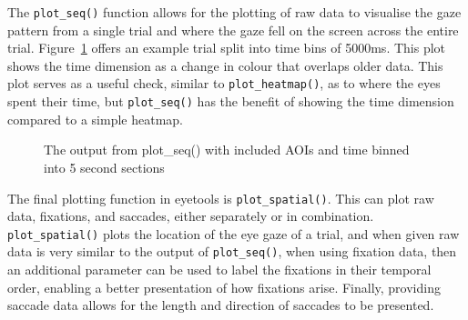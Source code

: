\documentclass[
  man,
  floatsintext,
  longtable,
  nolmodern,
  notxfonts,
  notimes,
  colorlinks=true,linkcolor=blue,citecolor=blue,urlcolor=blue]{apa7}
\newenvironment{Shaded}{\begin{snugshade}}{\end{snugshade}}
\newcommand{\AttributeTok}[1]{\textcolor[rgb]{0.40,0.45,0.13}{#1}}
\newcommand{\CommentTok}[1]{\textcolor[rgb]{0.37,0.37,0.37}{#1}}
\newcommand{\DecValTok}[1]{\textcolor[rgb]{0.68,0.00,0.00}{#1}}
\newcommand{\FunctionTok}[1]{\textcolor[rgb]{0.28,0.35,0.67}{#1}}
\newcommand{\NormalTok}[1]{\textcolor[rgb]{0.00,0.23,0.31}{#1}}
\newcommand{\SpecialCharTok}[1]{\textcolor[rgb]{0.37,0.37,0.37}{#1}}
\begin{document}
The \texttt{plot\_seq()} function allows for the plotting of raw data to
visualise the gaze pattern from a single trial and where the gaze fell
on the screen across the entire trial. Figure~\ref{fig-seq} offers an
example trial split into time bins of 5000ms. This plot shows the time
dimension as a change in colour that overlaps older data. This plot
serves as a useful check, similar to \texttt{plot\_heatmap()}, as to
where the eyes spent their time, but \texttt{plot\_seq()} has the
benefit of showing the time dimension compared to a simple heatmap.

\begin{Shaded}
\end{Shaded}

\begin{figure}[H]

\caption{\label{fig-seq}The output from plot\_seq() with included AOIs
and time binned into 5 second sections}


\end{figure}%

The final plotting function in eyetools is \texttt{plot\_spatial()}.
This can plot raw data, fixations, and saccades, either separately or in
combination. \texttt{plot\_spatial()} plots the location of the eye gaze
of a trial, and when given raw data is very similar to the output of
\texttt{plot\_seq()}, when using fixation data, then an additional
parameter can be used to label the fixations in their temporal order,
enabling a better presentation of how fixations arise. Finally,
providing saccade data allows for the length and direction of saccades
to be presented.
\end{document}
